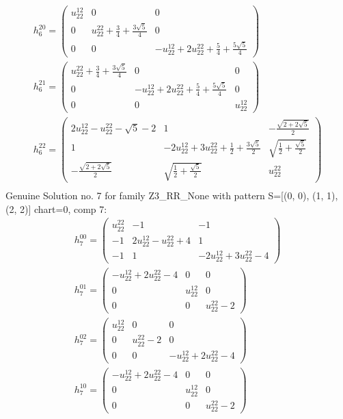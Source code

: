 \documentclass[a4paper, 11pt, twoside, onecolumn]{article}
\begin{document}
\begin{landscape}
\begin{gather*}
	 h_6^{20}=\begin{pmatrix}u^{12}_{22} & 0 & 0\\0 & u^{22}_{22} + \frac{3}{4} + \frac{3 \sqrt{5}}{4} & 0\\0 & 0 & - u^{12}_{22} + 2 u^{22}_{22} + \frac{5}{4} + \frac{5 \sqrt{5}}{4}\end{pmatrix}\\ 
	 h_6^{21}=\begin{pmatrix}u^{22}_{22} + \frac{3}{4} + \frac{3 \sqrt{5}}{4} & 0 & 0\\0 & - u^{12}_{22} + 2 u^{22}_{22} + \frac{5}{4} + \frac{5 \sqrt{5}}{4} & 0\\0 & 0 & u^{12}_{22}\end{pmatrix}\\ 
	 h_6^{22}=\begin{pmatrix}2 u^{12}_{22} - u^{22}_{22} - \sqrt{5} - 2 & 1 & - \frac{\sqrt{2 + 2 \sqrt{5}}}{2}\\1 & - 2 u^{12}_{22} + 3 u^{22}_{22} + \frac{1}{2} + \frac{3 \sqrt{5}}{2} & \sqrt{\frac{1}{2} + \frac{\sqrt{5}}{2}}\\- \frac{\sqrt{2 + 2 \sqrt{5}}}{2} & \sqrt{\frac{1}{2} + \frac{\sqrt{5}}{2}} & u^{22}_{22}\end{pmatrix}\\ 
\end{gather*} 
Genuine Solution no. 7 for family Z3_RR_None with pattern S=[(0, 0), (1, 1), (2, 2)] chart=0, comp 7: 
\begin{gather*} 
	 h_7^{00}=\begin{pmatrix}u^{22}_{22} & -1 & -1\\-1 & 2 u^{12}_{22} - u^{22}_{22} + 4 & 1\\-1 & 1 & - 2 u^{12}_{22} + 3 u^{22}_{22} - 4\end{pmatrix}\\ 
	 h_7^{01}=\begin{pmatrix}- u^{12}_{22} + 2 u^{22}_{22} - 4 & 0 & 0\\0 & u^{12}_{22} & 0\\0 & 0 & u^{22}_{22} - 2\end{pmatrix}\\ 
	 h_7^{02}=\begin{pmatrix}u^{12}_{22} & 0 & 0\\0 & u^{22}_{22} - 2 & 0\\0 & 0 & - u^{12}_{22} + 2 u^{22}_{22} - 4\end{pmatrix}\\ 
	 h_7^{10}=\begin{pmatrix}- u^{12}_{22} + 2 u^{22}_{22} - 4 & 0 & 0\\0 & u^{12}_{22} & 0\\0 & 0 & u^{22}_{22} - 2\end{pmatrix}\\ 

\end{gather*}
\end{landscape}
\end{document}
